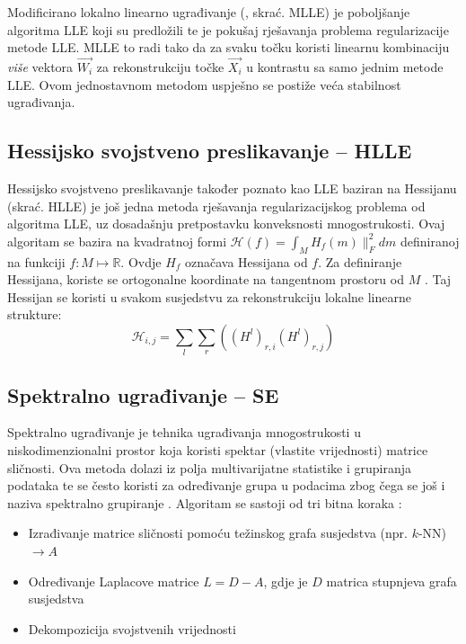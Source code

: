 \documentclass[times, utf8, diplomski]{fer}
\begin{document}
Modificirano lokalno linearno ugrađivanje (, skrać. MLLE) je poboljšanje algoritma LLE koji su predložili \cite{zhang2007mlle} te je pokušaj rješavanja problema regularizacije metode LLE. MLLE to radi tako da za svaku točku koristi linearnu kombinaciju \emph{više} vektora $\vec{W_{i}}$ za rekonstrukciju točke $\vec{X_i}$ u kontrastu sa samo jednim metode LLE. Ovom jednostavnom metodom uspješno se postiže veća stabilnost ugrađivanja.

\subsection{Hessijsko svojstveno preslikavanje -- HLLE}

Hessijsko svojstveno preslikavanje  također poznato kao LLE baziran na Hessijanu (skrać. HLLE) je još jedna metoda rješavanja regularizacijskog problema od algoritma LLE, uz dosadašnju pretpostavku konveksnosti mnogostrukosti. Ovaj algoritam se bazira na kvadratnoj formi $\mathcal{H}(f) = \int_M H_f(m)\|_F^2 dm$ definiranoj na funkciji $f: M \mapsto \mathbb{R}$. Ovdje $H_f$ označava Hessijana od $f$. Za definiranje Hessijana, koriste se ortogonalne koordinate na tangentnom prostoru od $M$ \citep{Donoho5591}. Taj Hessijan se koristi u svakom susjedstvu za rekonstrukciju lokalne linearne strukture:
\begin{equation}
    \mathcal{H}_{i,j} = \sum_l \sum_r ((H^l)_{r,i}(H^l)_{r,j})
\end{equation}


\subsection{Spektralno ugrađivanje -- SE}
Spektralno ugrađivanje  je tehnika ugrađivanja mnogostrukosti u niskodimenzionalni prostor koja koristi spektar (vlastite vrijednosti) matrice sličnosti. Ova metoda dolazi iz polja multivarijatne statistike i grupiranja podataka te se često koristi za određivanje grupa u podacima zbog čega se još i naziva spektralno grupiranje . Algoritam se sastoji od tri bitna koraka \citep{belkin2003laplacian}:
\begin{itemize}
    \item Izrađivanje matrice sličnosti pomoću težinskog grafa susjedstva (npr. $k$-NN) $\rightarrow A$
    \item Određivanje Laplacove matrice $L = D - A$, gdje je $D$ matrica stupnjeva grafa susjedstva
    \item Dekompozicija svojstvenih vrijednosti 
\end{itemize}
\end{document}
